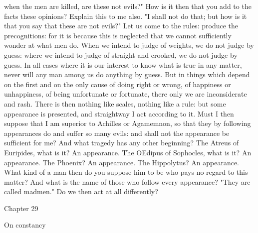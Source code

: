 \documentclass[a4paper]{article}
\begin{document}
when the men are killed, are these not evils?" How is it then that you add to
the facts these opinions? Explain this to me also. "I shall not do that; but
how is it that you say that these are not evils?" Let us come to the rules:
produce the precognitions: for it is because this is neglected that we cannot
sufficiently wonder at what men do. When we intend to judge of weights, we do
not judge by guess: where we intend to judge of straight and crooked, we do not
judge by guess. In all cases where it is our interest to know what is true in
any matter, never will any man among us do anything by guess. But in things
which depend on the first and on the only cause of doing right or wrong, of
happiness or unhappiness, of being unfortunate or fortunate, there only we are
inconsiderate and rash. There is then nothing like scales, nothing like a rule:
but some appearance is presented, and straightway I act according to it. Must I
then suppose that I am superior to Achilles or Agamemnon, so that they by
following appearances do and suffer so many evils: and shall not the appearance
be sufficient for me? And what tragedy has any other beginning? The Atreus of
Euripides, what is it? An appearance. The OEdipus of Sophocles, what is it? An
appearance. The Phoenix? An appearance. The Hippolytus? An appearance. What
kind of a man then do you suppose him to be who pays no regard to this matter?
And what is the name of those who follow every appearance? "They are called
madmen." Do we then act at all differently?

Chapter 29

On constancy
\end{document}

